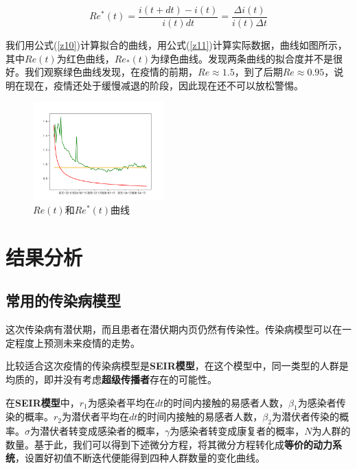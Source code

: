 \documentclass{article}
\begin{document}
\begin{multicols}{2}
                \begin{equation}
                    Re^{*}(t)=\frac{i(t+dt)-i(t)}{i(t)dt}=\frac{{\Delta}i(t)}{i(t){\Delta}t}
                    \label{z11}
                \end{equation}

                我们用公式(\ref{z10})计算拟合的曲线，用公式(\ref{z11})计算实际数据，曲线如图所示，其中$Re(t)$为红色曲线，$Re_{*}(t)$为绿色曲线。发现两条曲线的拟合度并不是很好。我们观察绿色曲线发现，在疫情的前期，$Re{\approx}1.5$，到了后期$Re{\approx}0.95$，说明在现在，疫情还处于缓慢减退的阶段，因此现在还不可以放松警惕。

                \begin{figure}[H]
                    \centering
                    \includegraphics[width=0.45\textwidth]{plot8.png}
                    \caption{$Re(t)$和$Re^{*}(t)$曲线}
                    \label{plot8}
                \end{figure}

        \section{结果分析}
            \subsection{常用的传染病模型}
                这次传染病有潜伏期，而且患者在潜伏期内页仍然有传染性。传染病模型可以在一定程度上预测未来疫情的走势。

                比较适合这次疫情的传染病模型是\textbf{SEIR模型}，在这个模型中，同一类型的人群是均质的，即并没有考虑\textbf{超级传播者}存在的可能性\cite{seir}。

                在\textbf{SEIR模型}中，$r_{1}$为感染者平均在$dt$的时间内接触的易感者人数，$\beta_{1}$为感染者传染的概率。$r_{2}$为潜伏者平均在$dt$的时间内接触的易感者人数，$\beta_{2}$为潜伏者传染的概率。$\sigma$为潜伏者转变成感染者的概率，$\gamma$为感染者转变成康复者的概率，$N$为人群的数量。基于此，我们可以得到下述微分方程，将其微分方程转化成\textbf{等价的动力系统}，设置好初值不断迭代便能得到四种人群数量的变化曲线。


\end{multicols}
\end{document}
